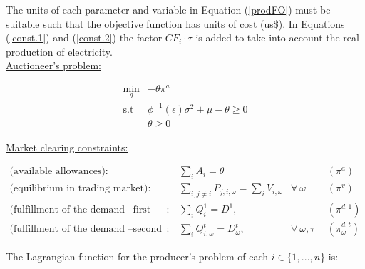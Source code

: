 \documentclass[11pt, letterpaper]{article}
\begin{document}
The units of each parameter and variable in Equation (\ref{prodFO}) must be suitable such that the objective function has units of cost (us\$). In Equations (\ref{const.1}) and (\ref{const.2}) the factor $CF_i \cdot \tau$ is added to take into account the real production of electricity.\\

\underline{Auctioneer's problem:}

\begin{align}
    \min_{\theta} & -\theta \pi^{a} \\
    \textrm{s.t \ } &  \phi^{-1}(\epsilon) \sigma^2 + \mu - \theta  \geq 0\\
    &  \theta  \geq 0
\end{align}
\vspace{0.5cm}

\underline{Market clearing constraints:}

\begin{align}
\textrm{(available allowances)}: &  \ \   \sum_{i} A_{i} = \theta   &  & \ \  (\pi^{a})\\
\textrm{(equilibrium in trading market)}: &   \ \  \sum_{i, j\neq i} P_{j,i,\omega} = \sum_{i} V_{i,\omega} & \forall \ \omega & \ \ (\pi^{v}) \\
\textrm{(fulfillment of the demand --first stage)}:  &   \ \  \sum_{i} Q^{1}_i = D^{1}, &  & \ \ (\pi^{d,1})\\
\textrm{(fulfillment of the demand --second stage)}:  &   \ \  \sum_{i} Q^{t}_{i,\omega} = D^{t}_{\omega}, & \forall \ \omega, \tau & \ \ (\pi^{d,t}_\omega)
\end{align}

\vspace{0.5cm}

The Lagrangian function for the producer's problem of each $i \in \{ 1,...,n\}$ is:
\end{document}
